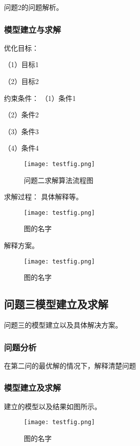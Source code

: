 \documentclass[bwprint]{gmcmthesis}
\begin{document}
问题2的问题解析。

\subsubsection{模型建立与求解}

优化目标：

 （1）目标1

 （2）目标2

约束条件：
 （1）条件1

 （2）条件2

 （3）条件3

 （4）条件4
 

\begin{figure}[!h]
\centering
\texttt{[image: testfig.png]}
\caption{问题二求解算法流程图}
\end{figure}

求解过程：
具体解释等。

\begin{figure}[!h]
\centering
\texttt{[image: testfig.png]}
\caption{图的名字}
\end{figure}

解释方案。

\begin{figure}[!h]
\centering
\texttt{[image: testfig.png]}
\caption{图的名字}
\end{figure}
\newpage
\subsection{问题三模型建立及求解}

问题三的模型建立以及具体解决方案。


\subsubsection{问题分析}

在第二问的最优解的情况下，解释清楚问题
 

\subsubsection{模型建立及求解}

建立的模型以及结果如图所示。


\begin{figure}[!h]
\centering
\texttt{[image: testfig.png]}
\caption{图的名字}
\end{figure}
\end{document}
